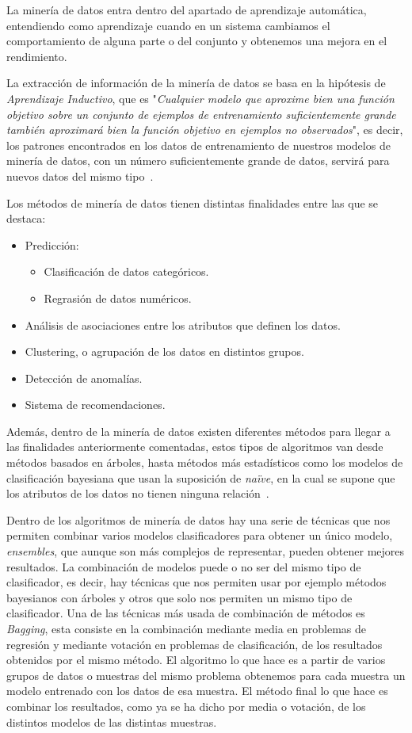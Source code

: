 La minería de datos entra dentro del apartado de aprendizaje automática, entendiendo como aprendizaje cuando en un sistema cambiamos el comportamiento de alguna parte o del conjunto y obtenemos una mejora en el rendimiento.

La extracción de información de la minería de datos se basa en la hipótesis de \textit{Aprendizaje Inductivo}, que es "\textit{Cualquier modelo que aproxime bien una función objetivo sobre un conjunto de ejemplos de entrenamiento suficientemente grande también aproximará bien la función objetivo en ejemplos no observados}", es decir, los patrones encontrados en los datos de entrenamiento de nuestros modelos de minería de datos, con un número suficientemente grande de datos, servirá para nuevos datos del mismo tipo~\cite{mdintro}.

Los métodos de minería de datos tienen distintas finalidades entre las que se destaca:
\begin{itemize}
	\item Predicción:
	\begin{itemize}
		\item Clasificación de datos categóricos.
		\item Regrasión de datos numéricos.
	\end{itemize}
	\item Análisis de asociaciones entre los atributos que definen los datos.
	\item Clustering, o agrupación de los datos en distintos grupos.
	\item Detección de anomalías.
	\item Sistema de recomendaciones.
\end{itemize}

Además, dentro de la minería de datos existen diferentes métodos para llegar a las finalidades anteriormente comentadas, estos tipos de algoritmos van desde métodos basados en árboles, hasta métodos más estadísticos como los modelos de clasificación bayesiana que usan la suposición de \textit{naïve}, en la cual se supone que los atributos de los datos no tienen ninguna relación~\cite{mdrf}.

Dentro de los algoritmos de minería de datos hay una serie de técnicas que nos permiten combinar varios modelos clasificadores para obtener un único modelo, \textit{ensembles}, que aunque son más complejos de representar, pueden obtener mejores resultados. La combinación de modelos puede o no ser del mismo tipo de clasificador, es decir, hay técnicas que nos permiten usar por ejemplo métodos bayesianos con árboles y otros que solo nos permiten un mismo tipo de clasificador. Una de las técnicas más usada de combinación de métodos es \textit{Bagging}, esta consiste en la combinación mediante media en problemas de regresión y mediante votación en problemas de clasificación, de los resultados obtenidos por el mismo método. El algoritmo lo que hace es a partir de varios grupos de datos o muestras del mismo problema obtenemos para cada muestra un modelo entrenado con los datos de esa muestra. El método final lo que hace es combinar los resultados, como ya se ha dicho por media o votación, de los distintos modelos de las distintas muestras.

